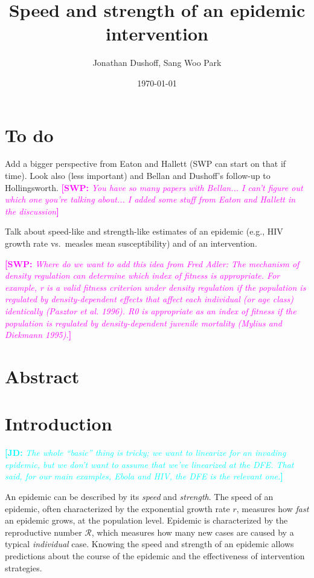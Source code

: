 \documentclass[12pt]{article}
\title{Speed and strength of an epidemic intervention}
\author{Jonathan Dushoff, Sang Woo Park}
\date{\today}
\newcommand{\comment}[3]{\textcolor{#1}{\textbf{[#2: }\textit{#3}\textbf{]}}}
\newcommand{\jd}[1]{\comment{cyan}{JD}{#1}}
\newcommand{\swp}[1]{\comment{magenta}{SWP}{#1}}
\newcommand{\RR}{\ensuremath{{\mathcal R}}}
\begin{document}
\maketitle

\section*{To do}

Add a bigger perspective from Eaton and Hallett (SWP can start on that if time). Look also (less important) and Bellan and Dushoff's follow-up to Hollingsworth. \swp{You have so many papers with Bellan... I can't figure out which one you're talking about... I added some stuff from Eaton and Hallett in the discussion}

Talk about speed-like and strength-like estimates of an epidemic (e.g., HIV growth rate vs.~measles mean susceptibility) and of an intervention.

\swp{Where do we want to add this idea from Fred Adler: The mechanism of density regulation can determine which index of fitness
is appropriate. For example, r is a valid fitness criterion under
density regulation if the population is regulated by density-dependent
effects that affect each individual (or age class) identically (Pasztor
et al. 1996). R0 is appropriate as an index of fitness if the population
is regulated by density-dependent juvenile mortality (Mylius and
Diekmann 1995).}

\section*{Abstract}



\section{Introduction}

\jd{The whole ``basic'' thing is tricky; we want to linearize for an invading epidemic, but we don't want to assume that we've linearized at the DFE. That said, for our main examples, Ebola and HIV, the DFE is the relevant one.}

An epidemic can be described by its \emph{speed} and \emph{strength}.
The speed of an epidemic, often characterized by the exponential growth rate $r$, measures how \emph{fast} an epidemic grows, at the population level. 
Epidemic is characterized by the reproductive number \RR, which measures how many new cases are caused by a typical \emph{individual} case.
Knowing the speed and strength of an epidemic allows predictions about the course of the epidemic and the effectiveness of intervention strategies.
\end{document}
